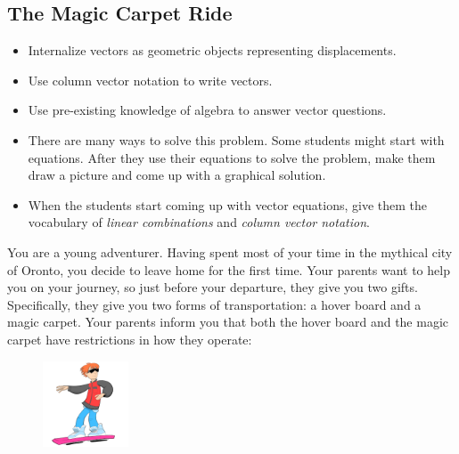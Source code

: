 \begin{iola}
\section*{The Magic Carpet Ride}

\question
\begin{annotation}
	\begin{goals}
		\begin{itemize}
			\item Internalize vectors as geometric objects representing
				displacements.

			\item Use column vector notation to write vectors.

			\item Use pre-existing knowledge of algebra to answer vector
				questions.
		\end{itemize}
	\end{goals}
	\begin{notes}

		\begin{itemize}
			\item There are many ways to solve this problem.
				Some students
				might start with equations. After they use their
				equations to solve the problem, make them draw a picture
				and come up with a graphical solution.

			\item When the students start coming up with vector equations,
				give them the vocabulary of \emph{linear
				combinations}
				and \emph{column vector notation}.
		\end{itemize}
	\end{notes}
\end{annotation}
You are a young adventurer. Having spent most of your time in the mythical city of Oronto,
	you decide to leave home for the first time. Your parents
want to help you on your journey, so just before your departure, they give you two
gifts. Specifically, they give you two forms of transportation: a hover board and
a magic carpet. Your parents inform you that both the hover board and the magic carpet
have restrictions in how they operate:

\begin{minipage}{\textwidth}
	\vspace{.5cm}
	\begin{figure}
	\vspace{-.8cm}
	\includegraphics[width=1in]{images/HoverBoard-small.png}
	\end{figure}


\end{minipage}
\end{iola}
